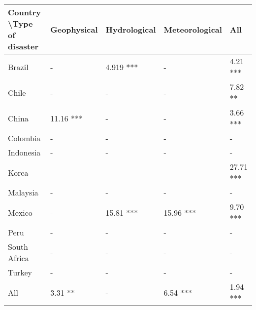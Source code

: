 \begin{tabular}{lllll}
\hline
Country \textbackslash Type of disaster & Geophysical & Hydrological & Meteorological & All \\ \hline
Brazil & - & 4.919 *** & - & 4.21 *** \\
Chile & - & - & - & 7.82 ** \\
China & 11.16 *** & - & - & 3.66 *** \\
Colombia & - & - & - & - \\
Indonesia & - & - & - & - \\
Korea & - & - & - & 27.71 *** \\
Malaysia & - & - & - & - \\
Mexico & - & 15.81 *** & 15.96 *** & 9.70 *** \\
Peru & - & - & - & - \\
South Africa & - & - & - & - \\
Turkey & - & - & - & - \\
All & 3.31 ** & - & 6.54 *** & 1.94 *** \\ \hline
\end{tabular}
